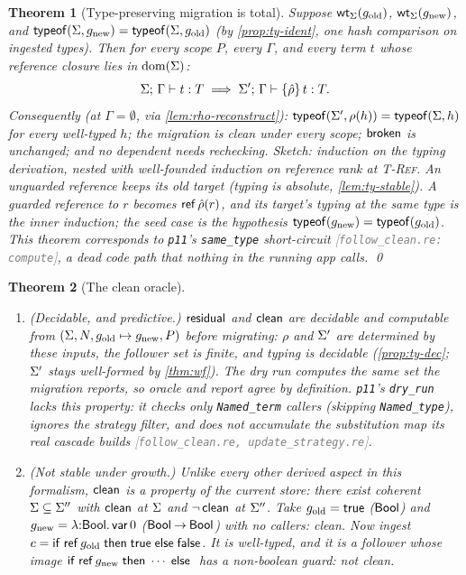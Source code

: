 \documentclass[11pt]{article}
\theoremstyle{definition}
\theoremstyle{plain}
\newtheorem{theorem}{Theorem}[section]
\theoremstyle{remark}
\newcommand{\src}[1]{{\footnotesize\textcolor{gray}{[\texttt{#1}]}}}
\begin{document}
\begin{theorem}[Type-preserving migration is total]\label{thm:tp-total}
Suppose $\mathsf{wt}_{\Sigma}(g_{\mathrm{old}})$, $\mathsf{wt}_{\Sigma}(g_{\mathrm{new}})$, and
$\mathsf{typeof}(\Sigma,g_{\mathrm{new}}) = \mathsf{typeof}(\Sigma,g_{\mathrm{old}})$ (by
\cref{prop:ty-ident}, one hash comparison on ingested types). Then for every scope $P$,
every $\Gamma$, and every term $t$ whose reference closure lies in $\operatorname{dom}(\Sigma)$:
\[
  \Sigma;\,\Gamma \vdash t : T \;\Longrightarrow\;
  \Sigma';\,\Gamma \vdash \{\hat\rho\}\,t : T.
\]
Consequently (at $\Gamma = \emptyset$, via \cref{lem:rho-reconstruct}):
$\mathsf{typeof}(\Sigma',\rho(h)) = \mathsf{typeof}(\Sigma,h)$ for every well-typed $h$; the migration
is clean under every scope; $\mathsf{broken}$ is unchanged; and no dependent needs rechecking.
\emph{Sketch:} induction on the typing derivation, nested with well-founded induction on
reference rank at \textsc{T-Ref}. An unguarded reference keeps its old target (typing is
absolute, \cref{lem:ty-stable}). A guarded reference to $r$ becomes $\mathsf{ref}\,\hat\rho(r)$, and
its target's typing at the same type is the inner induction; the seed case is the hypothesis
$\mathsf{typeof}(g_{\mathrm{new}}) = \mathsf{typeof}(g_{\mathrm{old}})$. This theorem corresponds to
\texttt{p11}'s \texttt{same\_type} short-circuit \src{follow\_clean.re: compute}, a dead code
path that nothing in the running app calls. \qed
\end{theorem}

\begin{theorem}[The clean oracle]\label{thm:clean-oracle}
\begin{enumerate}[nosep,label=(\alph*)]
  \item \emph{(Decidable, and predictive.)} $\mathsf{residual}$ and $\mathsf{clean}$ are decidable and
  computable from $(\Sigma, N, g_{\mathrm{old}} \mapsto g_{\mathrm{new}}, P)$
  before migrating: $\rho$ and $\Sigma'$ are determined by these inputs, the follower set is
  finite, and typing is decidable (\cref{prop:ty-dec}; $\Sigma'$ stays well-formed by
  \cref{thm:wf}). The dry run computes the same set the migration reports, so oracle and
  report agree by definition. \texttt{p11}'s \texttt{dry\_run} lacks this property: it checks
  only \texttt{Named\_term} callers (skipping \texttt{Named\_type}), ignores the strategy
  filter, and does not accumulate the substitution map its real cascade builds
  \src{follow\_clean.re, update\_strategy.re}.
  \item \emph{(Not stable under growth.)} Unlike every other derived aspect in this
  formalism, $\mathsf{clean}$ is a property of the current store: there exist coherent
  $\Sigma \subseteq \Sigma''$ with $\mathsf{clean}$ at $\Sigma$ and $\lnot\,\mathsf{clean}$ at $\Sigma''$.
  Take $g_{\mathrm{old}} = \mathsf{true}$ ($\mathsf{Bool}$) and
  $g_{\mathrm{new}} = \lambda{:}\mathsf{Bool}.\,\mathsf{var}\,0$ ($\mathsf{Bool} \mathbin{\to} \mathsf{Bool}$) with no
  callers: clean. Now ingest $c = \mathsf{if}\;\mathsf{ref}\,g_{\mathrm{old}}\;\mathsf{then}\;\mathsf{true}\;\mathsf{else}\;\mathsf{false}$. It is
  well-typed, and it is a follower whose image
  $\mathsf{if}\;\mathsf{ref}\,g_{\mathrm{new}}\;\mathsf{then}\;\cdots\;\mathsf{else}\;$ has a non-boolean guard: not clean.
\end{enumerate}
\end{theorem}
\end{document}
